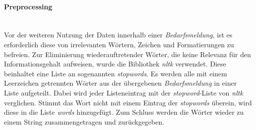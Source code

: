 \paragraph{Preprocessing}\mbox{}\\
Vor der weiteren Nutzung der Daten innerhalb einer \emph{Bedarfsmeldung}, ist es erforderlich diese von irrelevanten Wörtern, Zeichen und Formatierungen zu befreien. %
Zur Eliminierung wiederauftretender Wörter, die keine Relevanz für den Informationsgehalt aufweisen, wurde die Bibliothek \emph{nltk} verwendet. Diese beinhaltet eine Liste an sogenannten \emph{stopwords}.
Es werden alle mit einem Leerzeichen getrennten Wörter aus der übergebenen \emph{Bedarfsmeldung} in einer Liste aufgeteilt. Dabei wird jeder Listeneintrag mit der \emph{stopword}-Liste von \emph{nltk} verglichen. Stimmt das Wort nicht mit einem Eintrag der \emph{stopwords} überein, wird diese in die Liste \emph{words} hinzugefügt. Zum Schluss werden die Wörter wieder zu einem String zusammengetragen und zurückgegeben. \\

